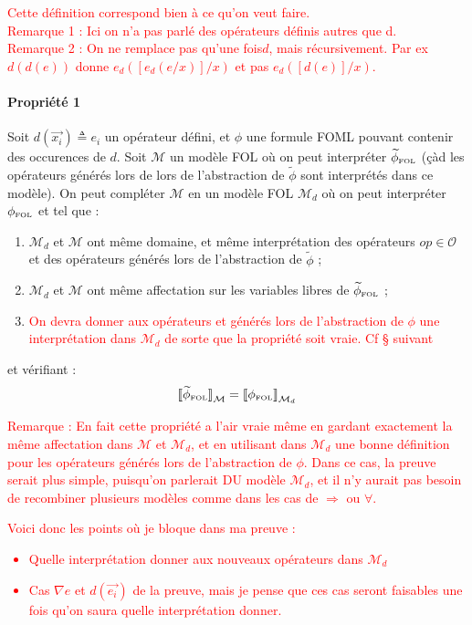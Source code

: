 \documentclass[12pt]{article}
\newcommand{\FOL}{\ensuremath{\textup{\tiny{}FOL}}}
\newcommand{\raph}[1]{\textcolor{red}{#1}}
\begin{document}
\raph{%
  Cette définition correspond bien à ce qu'on veut faire.\\
  Remarque 1 : Ici on n'a pas parlé des opérateurs définis autres que d.\\
  Remarque 2 : On ne remplace pas \og{}qu'une fois\fg $d$, mais récursivement.
  Par ex $d(d(e))$ donne $e_d([e_d(e/x)]/x)$ et pas $e_d([d(e)]/x)$.}


\paragraph{Propriété 1}
\label{prop_sem}
Soit $d(\vec{x_i}) \triangleq e_i$ un opérateur défini, et $\phi$ une formule FOML pouvant contenir des occurences de $d$.
Soit $\mathcal{M}$ un modèle FOL où on peut interpréter $\widetilde{\phi}_\FOL$ (çàd les opérateurs générés lors de lors de l'abstraction de $\widetilde{\phi}$ sont interprétés dans ce modèle).
On peut compléter $\mathcal{M}$ en un modèle FOL $\mathcal{M}_d$ où on peut interpréter $\phi_\FOL$ et tel que :
\begin{enumerate}
\item
  $\mathcal{M}_d$ et $\mathcal{M}$ ont même domaine, et même interprétation des opérateurs $op \in \mathcal{O}$ et des opérateurs générés lors de l'abstraction de $\widetilde{\phi}$ ;
\item
  $\mathcal{M}_d$ et $\mathcal{M}$ ont même affectation sur les variables libres de $\widetilde{\phi}_\FOL$ ;
\item
  \raph{On devra donner aux opérateurs \framebox{$\lambda z : \nabla e$} et \framebox{$d_{\vec{\epsilon}}$} générés lors de l'abstraction de $\phi$ une interprétation dans $\mathcal{M}_d$ de sorte que la propriété soit vraie. Cf § suivant}
\end{enumerate}
et vérifiant :
\[
  {\llbracket \widetilde{\phi}_\FOL \rrbracket}_{\mathcal{M}} = {\llbracket \phi_\FOL \rrbracket}_{\mathcal{M}_d}
\]

\raph{%
  Remarque : En fait cette propriété a l'air vraie même en gardant exactement la même affectation dans $\mathcal{M}$ et $\mathcal{M}_d$, et en utilisant dans $\mathcal{M}_d$ une bonne définition pour les opérateurs générés lors de l'abstraction de $\phi$.
  Dans ce cas, la preuve serait plus simple, puisqu'on parlerait DU modèle $\mathcal{M}_d$, et il n'y aurait pas besoin de recombiner plusieurs modèles comme dans les cas de $\Rightarrow$ ou $\forall$.}

\raph{%
  Voici donc les points où je bloque dans ma preuve :
  \begin{itemize}
  \item
    Quelle interprétation donner aux nouveaux opérateurs dans $\mathcal{M}_d$
  \item
    Cas $\nabla e$ et $d(\vec{e_i})$ de la preuve, mais je pense que ces cas seront faisables une fois qu'on saura quelle interprétation donner.
  \end{itemize}}
\end{document}
